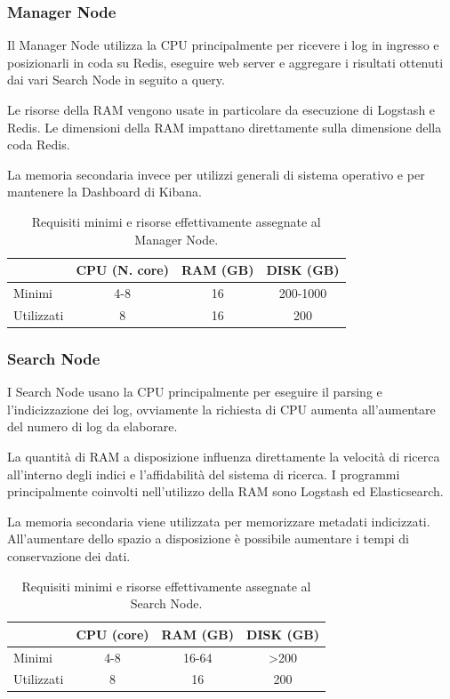 \subsubsection*{Manager Node}
Il Manager Node utilizza la CPU principalmente per ricevere i log in ingresso e posizionarli in coda su Redis, eseguire web server e aggregare i risultati ottenuti dai vari Search Node in seguito a query. 

Le risorse della RAM vengono usate in particolare da esecuzione di Logstash e Redis. Le dimensioni della RAM impattano direttamente sulla dimensione della coda Redis.

La memoria secondaria invece  per utilizzi generali di sistema operativo e per mantenere la Dashboard di Kibana.


\begin{table}[hbtp]
    \centering
    \begin{tabular}{|l|c|c|c|}
        \hline
        & CPU (N. core) & RAM (GB) & DISK (GB) \\
        \hline
        Minimi     & 4-8 & 16 & 200-1000   \\
        \hline
        Utilizzati & 8   & 16  & 200 \\
        \hline
    \end{tabular}
    \caption{Requisiti minimi e risorse effettivamente assegnate al Manager Node.}
    \label{tab:requisitiHw1}
\end{table}


\subsubsection*{Search Node}

I Search Node usano la CPU principalmente per eseguire il parsing e l'indicizzazione dei log, ovviamente la richiesta di CPU aumenta all'aumentare del numero di log da elaborare.

La quantità di RAM a disposizione influenza direttamente la velocità di ricerca all'interno degli indici e l'affidabilità del sistema di ricerca. I programmi principalmente coinvolti nell'utilizzo della RAM sono Logstash ed Elasticsearch.

La memoria secondaria viene utilizzata per memorizzare metadati indicizzati. All'aumentare dello spazio a disposizione è possibile aumentare i tempi di conservazione dei dati.

\begin{table}[hbtp]
    \centering
    \begin{tabular}{|l|c|c|c|}
        \hline
        & CPU (core) & RAM (GB) & DISK (GB) \\
        \hline
        Minimi     & 4-8 & 16-64 & >200   \\
        \hline
        Utilizzati & 8   & 16  & 200 \\
        \hline
    \end{tabular}
    \caption{Requisiti minimi e risorse effettivamente assegnate al Search Node.}
    \label{tab:requisitiHw2}
\end{table}



